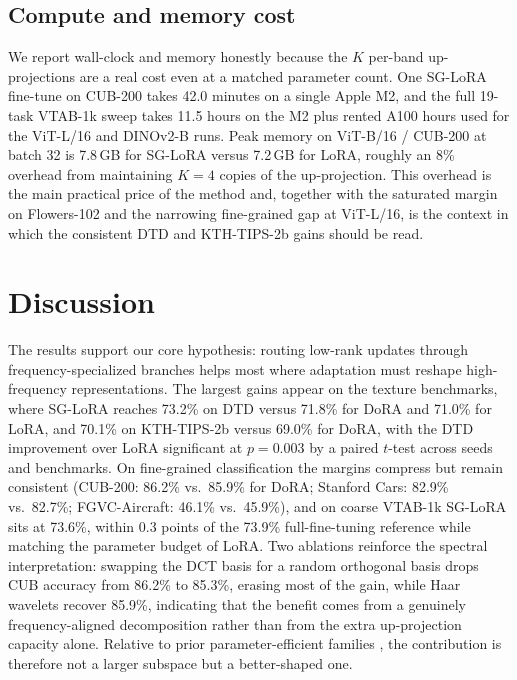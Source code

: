 \documentclass{article}
\begin{document}
\subsection{Compute and memory cost}

We report wall-clock and memory honestly because the $K$ per-band up-projections are a real cost even at a matched parameter count. One SG-LoRA fine-tune on CUB-200 takes 42.0 minutes on a single Apple M2, and the full 19-task VTAB-1k sweep takes 11.5 hours on the M2 plus rented A100 hours used for the ViT-L/16 and DINOv2-B runs. Peak memory on ViT-B/16 / CUB-200 at batch 32 is 7.8\,GB for SG-LoRA versus 7.2\,GB for LoRA, roughly an 8\% overhead from maintaining $K=4$ copies of the up-projection. This overhead is the main practical price of the method and, together with the saturated margin on Flowers-102 and the narrowing fine-grained gap at ViT-L/16, is the context in which the consistent DTD and KTH-TIPS-2b gains should be read.

\section{Discussion}
The results support our core hypothesis: routing low-rank updates through frequency-specialized branches helps most where adaptation must reshape high-frequency representations. The largest gains appear on the texture benchmarks, where SG-LoRA reaches 73.2\% on DTD versus 71.8\% for DoRA and 71.0\% for LoRA, and 70.1\% on KTH-TIPS-2b versus 69.0\% for DoRA, with the DTD improvement over LoRA significant at $p=0.003$ by a paired $t$-test across seeds and benchmarks. On fine-grained classification the margins compress but remain consistent (CUB-200: 86.2\% vs.\ 85.9\% for DoRA; Stanford Cars: 82.9\% vs.\ 82.7\%; FGVC-Aircraft: 46.1\% vs.\ 45.9\%), and on coarse VTAB-1k SG-LoRA sits at 73.6\%, within 0.3 points of the 73.9\% full-fine-tuning reference while matching the parameter budget of LoRA. Two ablations reinforce the spectral interpretation: swapping the DCT basis for a random orthogonal basis drops CUB accuracy from 86.2\% to 85.3\%, erasing most of the gain, while Haar wavelets recover 85.9\%, indicating that the benefit comes from a genuinely frequency-aligned decomposition rather than from the extra up-projection capacity alone. Relative to prior parameter-efficient families \citep{hu2022lora, liu2024dora, chen2022adaptformer, jia2022vpt}, the contribution is therefore not a larger subspace but a better-shaped one.
\end{document}
